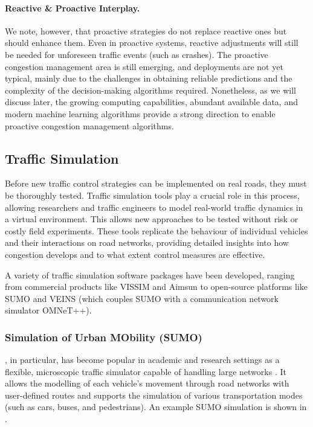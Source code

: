 \paragraph{Reactive \& Proactive Interplay.} We note, however, that proactive strategies do not replace reactive ones but should enhance them. Even in proactive systems, reactive adjustments will still be needed for unforeseen traffic events (such as crashes). The proactive congestion management area is still emerging, and deployments are not yet typical, mainly due to the challenges in obtaining reliable predictions and the complexity of the decision-making algorithms required. Nonetheless, as we will discuss later, the growing computing capabilities, abundant available data, and modern machine learning algorithms provide a strong direction to enable proactive congestion management algorithms.

\subsection{Traffic Simulation}
Before new traffic control strategies can be implemented on real roads, they must be thoroughly tested. Traffic simulation tools play a crucial role in this process, allowing researchers and traffic engineers to model real-world traffic dynamics in a virtual environment. This allows new approaches to be tested without risk or costly field experiments. These tools replicate the behaviour of individual vehicles and their interactions on road networks, providing detailed insights into how congestion develops and to what extent control measures are effective.

A variety of traffic simulation software packages have been developed, ranging from commercial products like VISSIM and Aimsun to open-source platforms like SUMO and VEINS (which couples SUMO with a communication network simulator OMNeT++).

\subsubsection{Simulation of Urban MObility (SUMO)}
, in particular, has become popular in academic and research settings as a flexible, microscopic traffic simulator capable of handling large networks \cite{krajzewicz_traffic_2010}. It allows the modelling of each vehicle’s movement through road networks with user-defined routes and supports the simulation of various transportation modes (such as cars, buses, and pedestrians). An example SUMO simulation is shown in .

